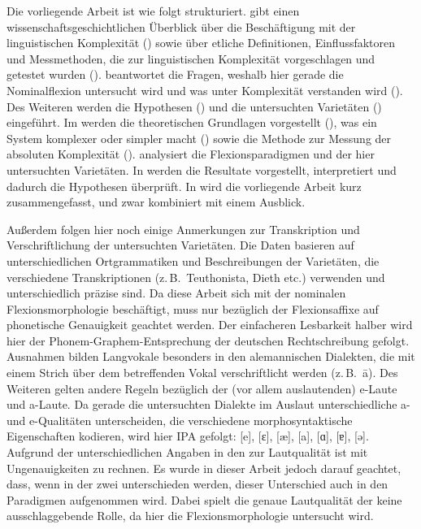 \noindent
Die vorliegende Arbeit ist wie folgt strukturiert.  gibt einen wissenschaftsgeschichtlichen Überblick über die Beschäftigung mit der linguistischen Komplexität () sowie über etliche Definitionen, Einflussfaktoren und Messmethoden, die zur linguistischen Komplexität vorgeschlagen und getestet wurden ().  beantwortet die Fragen, weshalb hier gerade die Nominalflexion untersucht wird und was unter Komplexität verstanden wird (). Des Weiteren werden die Hypothesen () und die untersuchten Varietäten () eingeführt. Im  werden die theoretischen Grundlagen vorgestellt (), was ein System komplexer oder simpler macht () sowie die Methode zur Messung der absoluten Komplexität ().  analysiert die Flexionsparadigmen und  der hier untersuchten Varietäten. In  werden die Resultate vorgestellt, interpretiert und dadurch die Hypothesen überprüft. In  wird die vorliegende Arbeit kurz zusammengefasst, und zwar kombiniert mit einem Ausblick.

Außerdem folgen hier noch einige Anmerkungen zur Transkription und Verschriftlichung der untersuchten Varietäten. Die Daten basieren auf unterschiedlichen Ortgrammatiken und Beschreibungen der Varietäten, die verschiedene Transkriptionen (z.\,B.\ Teuthonista, Dieth etc.) verwenden und unterschiedlich präzise sind. Da diese Arbeit sich mit der nominalen Flexionsmorphologie beschäftigt, muss nur bezüglich der Flexionsaffixe auf phonetische Genauigkeit geachtet werden. Der einfacheren Lesbarkeit halber wird hier der Pho\-nem-Gra\-phem-Ent\-spre\-chung der deutschen Rechtschreibung gefolgt. Ausnahmen bilden Langvokale besonders in den alemannischen Dialekten, die mit einem Strich über dem betreffenden Vokal verschriftlicht werden (z.\,B.\ \=a). Des Weiteren gelten andere Regeln bezüglich der (vor allem auslautenden) e-Laute und a-Laute. Da gerade die untersuchten Dialekte im Auslaut unterschiedliche a- und e-Qualitäten unterscheiden, die verschiedene morphosyntaktische Eigenschaften kodieren, wird hier IPA gefolgt: [e], [ɛ], [æ], [a], [ɑ], [ɐ], [ə]. Aufgrund der unterschiedlichen Angaben in den  zur Lautqualität ist mit Ungenauigkeiten zu rechnen. Es wurde in dieser Arbeit jedoch darauf geachtet, dass, wenn in der  zwei  unterschieden werden, dieser Unterschied auch in den Paradigmen aufgenommen wird. Dabei spielt die genaue Lautqualität der  keine ausschlaggebende Rolle, da hier die Flexionsmorphologie untersucht wird.

